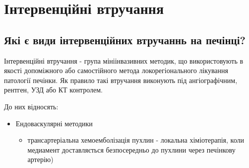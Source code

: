 \chapter{Інтервенційні втручання}


\section{Які є види інтервенційних втручаннь на печінці?}
Інтервенційні втручання - група мініінвазивних методик, що використовують в якості допоміжного або самостійного метода локорегіонального лікування патології печінки.  Як правило такі втручання виконують під ангіографічним, рентген, УЗД або КТ контролем.

До них відносять:
\begin{itemize}
    \item Ендоваскулярні методики
    \begin{itemize}
        \item трансартеріальна хемоемболізація пухлин - локальна хіміотерапія, коли медиамент доставляється безпосередньо до пухлини через печінкову артерію)
        

\end{itemize}
\end{itemize}
